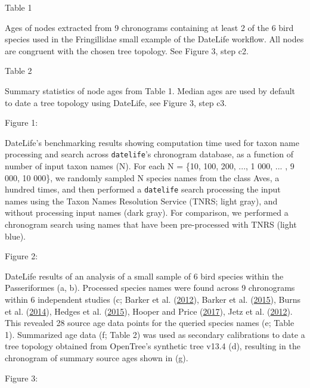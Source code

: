 Table 1

Ages of nodes extracted from 9 chronograms containing at least 2 of the 6 bird species used in the Fringillidae small example of the DateLife workflow. All nodes are congruent with the chosen tree topology. See Figure 3, step c2.

Table 2

Summary statistics of node ages from Table 1. Median ages are used by default to date a tree topology using DateLife, see Figure 3, step c3.

Figure 1:

DateLife's benchmarking results showing computation time used for taxon name processing and search across \texttt{datelife}'s chronogram database, as a function of number of input taxon names (N). For each N = \{10, 100, 200, ..., 1 000, ... , 9 000, 10 000\}, we randomly sampled N species names from the class Aves, a hundred times, and then performed a \texttt{datelife} search processing the input names using the Taxon Names Resolution Service (TNRS; light gray), and without processing input names (dark gray). For comparison, we performed a chronogram search using names that have been pre-processed with TNRS (light blue).

Figure 2:

DateLife results of an analysis of a small sample of 6 bird species within the Passeriformes (a, b). Processed species names were found across 9 chronograms within 6 independent studies (c; Barker et al. (\protect\hyperlink{ref-barker2012going}{2012}), Barker et al. (\protect\hyperlink{ref-barker2015new}{2015}), Burns et al. (\protect\hyperlink{ref-burns2014phylogenetics}{2014}), Hedges et al. (\protect\hyperlink{ref-Hedges2015}{2015}), Hooper and Price (\protect\hyperlink{ref-hooper2017chromosomal}{2017}), Jetz et al. (\protect\hyperlink{ref-Jetz2012}{2012}). This revealed 28 source age data points for the queried species names (e; Table 1). Summarized age data (f; Table 2) was used as secondary calibrations to date a tree topology obtained from OpenTree's synthetic tree v13.4 (d), resulting in the chronogram of summary source ages shown in (g).




Figure 3:

